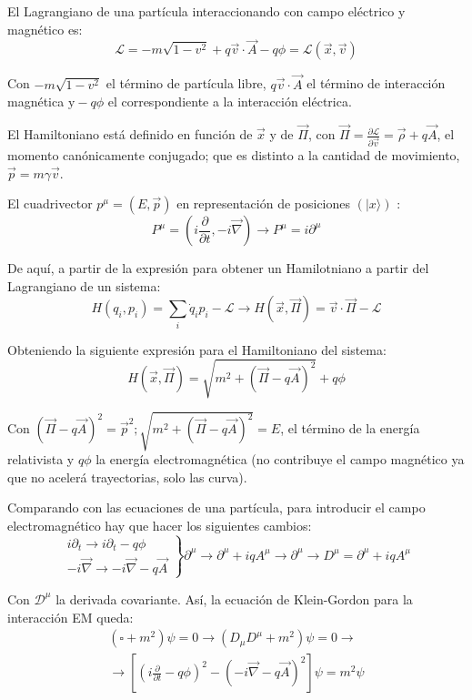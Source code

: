 El Lagrangiano de una partícula interaccionando con campo eléctrico y magnético es:
$$
\begin{equation*}
\mathcal{L}=-m \sqrt{1-v^{2}}+q \vec{v} \cdot \vec{A}-q \phi=\mathcal{L}(\vec{x}, \vec{v}) \tag{1.6}
\end{equation*}
$$

Con $-m \sqrt{1-v^{2}}$ el término de partícula libre, $q \vec{v} \cdot \vec{A}$ el término de interacción magnética $\mathrm{y}-q \phi$ el correspondiente a la interacción eléctrica.

El Hamiltoniano está definido en función de $\vec{x}$ y de $\vec{\Pi}$, con $\vec{\Pi}=\frac{\partial \mathcal{L}}{\partial \vec{v}}=\vec{\rho}+q \vec{A}$, el momento canónicamente conjugado; que es distinto a la cantidad de movimiento, $\vec{p}=m \gamma \vec{v}$.

El cuadrivector $p^{\mu}=(E, \vec{p})$ en representación de posiciones $(|x\rangle)$ :
$$
P^{\mu}=\left(i \frac{\partial}{\partial t},-i \vec{\nabla}\right) \rightarrow P^{\mu}=i \partial^{\mu}
$$

De aquí, a partir de la expresión para obtener un Hamilotniano a partir del Lagrangiano de un sistema:
$$
H\left(q_{i}, p_{i}\right)=\sum_{i} \dot{q}_{i} p_{i}-\mathcal{L} \rightarrow H(\vec{x}, \vec{\Pi})=\vec{v} \cdot \vec{\Pi}-\mathcal{L}
$$

Obteniendo la siguiente expresión para el Hamiltoniano del sistema:
$$
\begin{equation*}
H(\vec{x}, \vec{\Pi})=\sqrt{m^{2}+(\vec{\Pi}-q \vec{A})^{2}}+q \phi \tag{1.7}
\end{equation*}
$$

Con $(\vec{\Pi}-q \vec{A})^{2}=\vec{p}^{2} ; \sqrt{m^{2}+(\vec{\Pi}-q \vec{A})^{2}}=E$, el término de la energía relativista y $q \phi$ la energía electromagnética (no contribuye el campo magnético ya que no acelerá trayectorias, solo las curva).

Comparando con las ecuaciones de una partícula, para introducir el campo electromagnético hay que hacer los siguientes cambios:
$$
\left.\begin{array}{c}
i \partial_{t} \longrightarrow i \partial_{t}-q \phi \\
-i \vec{\nabla} \longrightarrow-i \vec{\nabla}-q \vec{A}
\end{array}\right\} \partial^{\mu} \rightarrow \partial^{\mu}+i q A^{\mu} \rightarrow \partial^{\mu} \longrightarrow D^{\mu}=\partial^{\mu}+i q A^{\mu}
$$

Con $\mathcal{D}^{\mu}$ la derivada covariante. Así, la ecuación de Klein-Gordon para la interacción EM queda:
$$
\begin{gather*}
\left(\square+m^{2}\right) \psi=0 \longrightarrow\left(D_{\mu} D^{\mu}+m^{2}\right) \psi=0 \rightarrow \\
\rightarrow\left[\left(i \frac{\partial}{\partial t}-q \phi\right)^{2}-(-i \vec{\nabla}-q \vec{A})^{2}\right] \psi=m^{2} \psi \tag{1.8}
\end{gather*}
$$

